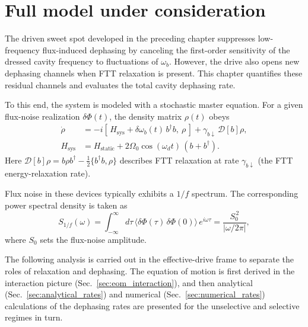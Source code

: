 \section{Full model under consideration}
\label{sec:full_model}

The driven sweet spot developed in the preceding chapter suppresses low-frequency flux-induced dephasing by canceling the first-order sensitivity of the dressed cavity frequency to fluctuations of $\omega_b$. However, the drive also opens new dephasing channels when FTT relaxation is present. This chapter quantifies these residual channels and evaluates the total cavity dephasing rate.

To this end, the system is modeled with a stochastic master equation. For a given flux-noise realization $\delta\Phi(t)$, the density matrix $\rho(t)$ obeys
\begin{align}
\dot{\rho}
&= -i\left[\,H_{\mathrm{sys}} + \delta\omega_b(t)\, b^\dagger b,\ \rho\,\right]
+ \gamma_{b\downarrow}\,\mathcal{D}[b]\rho,
\nonumber \\
H_{\mathrm{sys}}
&= H_{\mathrm{static}} + 2\Omega_0 \cos(\omega_d t)\,(b + b^\dagger).
\label{eq:Linblad_ch8}\end{align}
Here $\mathcal{D}[b]\rho = b\rho b^\dagger - \tfrac{1}{2}\{b^\dagger b, \rho\}$ describes FTT relaxation at rate $\gamma_{b\downarrow}$ (the FTT energy-relaxation rate).

Flux noise in these devices typically exhibits a $1/f$ spectrum. The corresponding power spectral density is taken as
\begin{equation}
S_{1/f}(\omega)
= \int_{-\infty}^{\infty} d\tau\, \langle \delta\Phi(\tau)\,\delta\Phi(0)\rangle\, e^{i\omega \tau}
= \frac{S_0^{\,2}}{\left|\omega/2\pi\right|},
\end{equation}
where $S_0$ sets the flux-noise amplitude.

The following analysis is carried out in the effective-drive frame to separate the roles of relaxation and dephasing. The equation of motion is first derived in the interaction picture (Sec.~\ref{sec:eom_interaction}), and then analytical (Sec.~\ref{sec:analytical_rates}) and numerical (Sec.~\ref{sec:numerical_rates}) calculations of the dephasing rates are presented for the unselective and selective regimes in turn.

